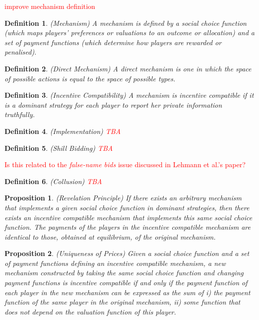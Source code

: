 \documentclass{article}
\newtheorem{proposition}{Proposition}
\newtheorem{definition}{Definition}
\begin{document}
\textcolor{red}{improve mechanism definition}

\begin{definition}
(Mechanism) A mechanism is defined by a social choice function (which maps players' preferences or valuations to an outcome or allocation) and a set of payment functions (which determine how players are rewarded or penalised).
\end{definition}

\begin{definition}
(Direct Mechanism) A direct mechanism is one in which the space of possible actions is equal to the space of possible types.
\end{definition}

\begin{definition}
(Incentive Compatibility) A mechanism is incentive compatible if it is a dominant strategy for each player to report her private information truthfully.
\end{definition}

\begin{definition}
(Implementation) \textcolor{red}{TBA}
\end{definition}

\begin{definition}
(Shill Bidding) \textcolor{red}{TBA}
\end{definition}

\textcolor{red}{Is this related to the \textit{false-name bids} issue discussed in Lehmann et al.'s paper?}

\begin{definition}
(Collusion) \textcolor{red}{TBA}
\end{definition}

\begin{proposition}
(Revelation Principle) If there exists an arbitrary mechanism that implements a given social choice function in dominant strategies, then there exists an incentive compatible mechanism that implements this same social choice function. The payments of the players in the incentive compatible mechanism are identical to those, obtained at equilibrium, of the original mechanism.
\end{proposition}

\begin{proposition}
(Uniqueness of Prices) Given a social choice function and a set of payment functions defining an incentive compatible mechanism, a new mechanism constructed by taking the same social choice function and changing payment functions is incentive compatible if and only if the payment function of each player in the new mechanism can be expressed as the sum of i) the payment function of the same player in the original mechanism, ii) some function that does not depend on the valuation function of this player.
\end{proposition}
\end{document}
